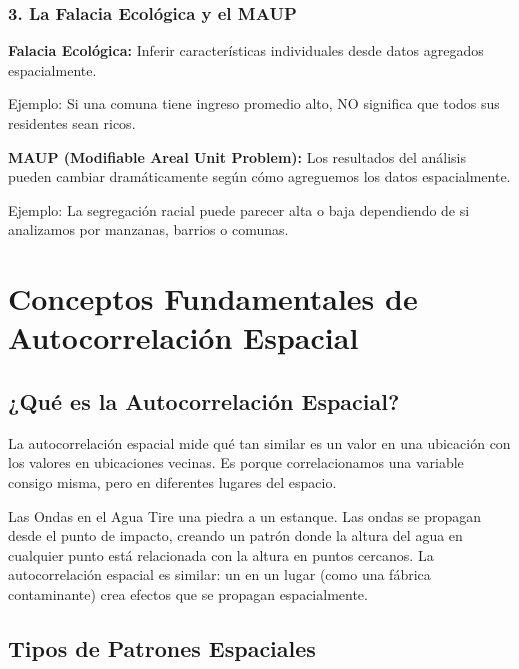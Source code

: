 \documentclass[12pt,a4paper]{article}
\begin{document}
\subsubsection{3. La Falacia Ecológica y el MAUP}

\begin{alertbox}
\textbf{Falacia Ecológica:} Inferir características individuales desde datos agregados espacialmente.

Ejemplo: Si una comuna tiene ingreso promedio alto, NO significa que todos sus residentes sean ricos.
\end{alertbox}

\begin{alertbox}
\textbf{MAUP (Modifiable Areal Unit Problem):} Los resultados del análisis pueden cambiar dramáticamente según cómo agreguemos los datos espacialmente.

Ejemplo: La segregación racial puede parecer alta o baja dependiendo de si analizamos por manzanas, barrios o comunas.
\end{alertbox}

\section{Conceptos Fundamentales de Autocorrelación Espacial}

\subsection{¿Qué es la Autocorrelación Espacial?}

La autocorrelación espacial mide qué tan similar es un valor en una ubicación con los valores en ubicaciones vecinas. Es  porque correlacionamos una variable consigo misma, pero en diferentes lugares del espacio.

\begin{analogia}{Las Ondas en el Agua}
Tire una piedra a un estanque. Las ondas se propagan desde el punto de impacto, creando un patrón donde la altura del agua en cualquier punto está relacionada con la altura en puntos cercanos. La autocorrelación espacial es similar: un  en un lugar (como una fábrica contaminante) crea efectos que se propagan espacialmente.
\end{analogia}

\subsection{Tipos de Patrones Espaciales}
\end{document}
